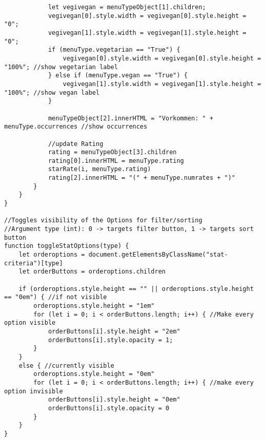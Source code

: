 \begin{lstlisting}
            let vegivegan = menuTypeObject[1].children;
            vegivegan[0].style.width = vegivegan[0].style.height = "0";
            vegivegan[1].style.width = vegivegan[1].style.height = "0";
            if (menuType.vegetarian == "True") {
                vegivegan[0].style.width = vegivegan[0].style.height = "100%"; //show vegetarian label
            } else if (menuType.vegan == "True") {
                vegivegan[1].style.width = vegivegan[1].style.height = "100%"; //show vegan label
            }

            menuTypeObject[2].innerHTML = "Vorkommen: " + menuType.occurrences //show occurrences

            //update Rating
            rating = menuTypeObject[3].children
            rating[0].innerHTML = menuType.rating
            starRate(i, menuType.rating)
            rating[2].innerHTML = "(" + menuType.numrates + ")"
        }
    }
}

//Toggles visibility of the Options for filter/sorting
//Argument type (int): 0 -> targets filter button, 1 -> targets sort button
function toggleStatOptions(type) {
    let orderoptions = document.getElementsByClassName("stat-criteria")[type]
    let orderButtons = orderoptions.children

    if (orderoptions.style.height == "" || orderoptions.style.height == "0em") { //if not visible
        orderoptions.style.height = "1em"
        for (let i = 0; i < orderButtons.length; i++) { //Make every option visible
            orderButtons[i].style.height = "2em"
            orderButtons[i].style.opacity = 1;
        }
    }
    else { //currently visible
        orderoptions.style.height = "0em"
        for (let i = 0; i < orderButtons.length; i++) { //make every option invisible
            orderButtons[i].style.height = "0em"
            orderButtons[i].style.opacity = 0
        }
    }
}
    
\end{lstlisting}